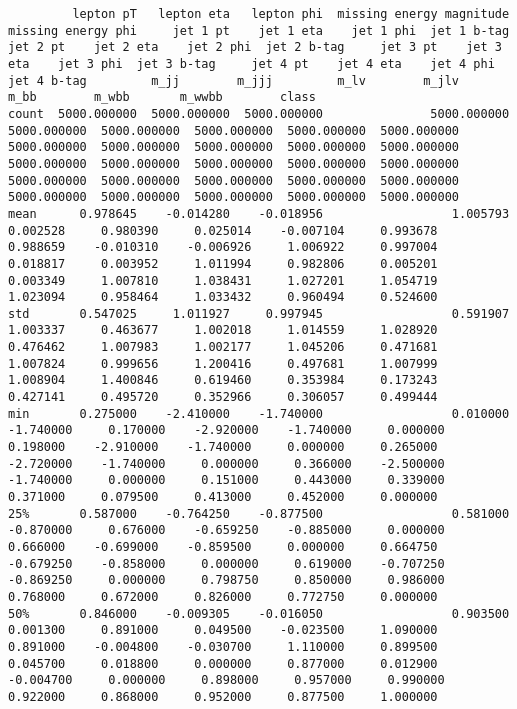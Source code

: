 \documentclass[11pt]{article}
\begin{document}
    \begin{verbatim}
         lepton pT   lepton eta   lepton phi  missing energy magnitude  missing energy phi     jet 1 pt    jet 1 eta    jet 1 phi  jet 1 b-tag     jet 2 pt    jet 2 eta    jet 2 phi  jet 2 b-tag     jet 3 pt    jet 3 eta    jet 3 phi  jet 3 b-tag     jet 4 pt    jet 4 eta    jet 4 phi  jet 4 b-tag         m_jj        m_jjj         m_lv        m_jlv         m_bb        m_wbb       m_wwbb        class
count  5000.000000  5000.000000  5000.000000               5000.000000         5000.000000  5000.000000  5000.000000  5000.000000  5000.000000  5000.000000  5000.000000  5000.000000  5000.000000  5000.000000  5000.000000  5000.000000  5000.000000  5000.000000  5000.000000  5000.000000  5000.000000  5000.000000  5000.000000  5000.000000  5000.000000  5000.000000  5000.000000  5000.000000  5000.000000
mean      0.978645    -0.014280    -0.018956                  1.005793            0.002528     0.980390     0.025014    -0.007104     0.993678     0.988659    -0.010310    -0.006926     1.006922     0.997004     0.018817     0.003952     1.011994     0.982806     0.005201     0.003349     1.007810     1.038431     1.027201     1.054719     1.023094     0.958464     1.033432     0.960494     0.524600
std       0.547025     1.011927     0.997945                  0.591907            1.003337     0.463677     1.002018     1.014559     1.028920     0.476462     1.007983     1.002177     1.045206     0.471681     1.007824     0.999656     1.200416     0.497681     1.007999     1.008904     1.400846     0.619460     0.353984     0.173243     0.427141     0.495720     0.352966     0.306057     0.499444
min       0.275000    -2.410000    -1.740000                  0.010000           -1.740000     0.170000    -2.920000    -1.740000     0.000000     0.198000    -2.910000    -1.740000     0.000000     0.265000    -2.720000    -1.740000     0.000000     0.366000    -2.500000    -1.740000     0.000000     0.151000     0.443000     0.339000     0.371000     0.079500     0.413000     0.452000     0.000000
25%       0.587000    -0.764250    -0.877500                  0.581000           -0.870000     0.676000    -0.659250    -0.885000     0.000000     0.666000    -0.699000    -0.859500     0.000000     0.664750    -0.679250    -0.858000     0.000000     0.619000    -0.707250    -0.869250     0.000000     0.798750     0.850000     0.986000     0.768000     0.672000     0.826000     0.772750     0.000000
50%       0.846000    -0.009305    -0.016050                  0.903500            0.001300     0.891000     0.049500    -0.023500     1.090000     0.891000    -0.004800    -0.030700     1.110000     0.899500     0.045700     0.018800     0.000000     0.877000     0.012900    -0.004700     0.000000     0.898000     0.957000     0.990000     0.922000     0.868000     0.952000     0.877500     1.000000

\end{verbatim}
\end{document}
